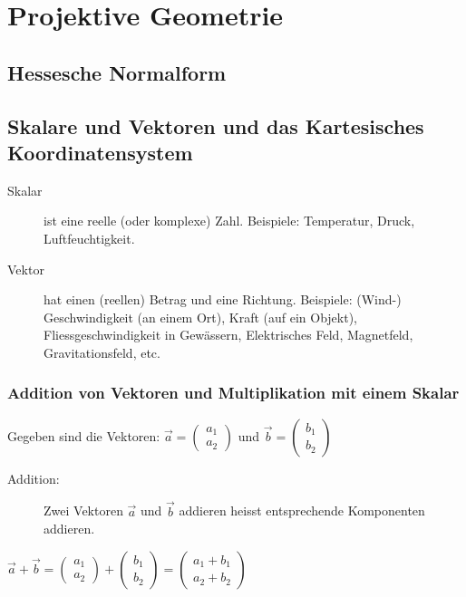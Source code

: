 \chapter{Projektive Geometrie}
\section{Hessesche Normalform}

\section{Skalare und Vektoren und das Kartesisches Koordinatensystem}

\begin{description}
	\item[Skalar]
	ist eine reelle (oder komplexe) Zahl. Beispiele: Temperatur,
	Druck, Luftfeuchtigkeit.
	\item[Vektor]
	hat einen (reellen) Betrag und eine Richtung. Beispiele:
	(Wind-) Geschwindigkeit (an einem Ort), Kraft (auf ein
	Objekt), Fliessgeschwindigkeit in Gewässern, Elektrisches
	Feld, Magnetfeld, Gravitationsfeld, etc.
\end{description}

\subsection{Addition von Vektoren und Multiplikation mit einem Skalar}

Gegeben sind die Vektoren:
\begin{math}
	\vec{a} = 
	\begin{pmatrix} a_{1} \\ a_{2} \end{pmatrix}
\end{math}
und
\begin{math}
	\vec{b} = 
	\begin{pmatrix} b_{1} \\ b_{2} \end{pmatrix}
\end{math}

\begin{description}
	\item[Addition:]
	Zwei Vektoren $\vec{a}$ und $\vec{b}$ addieren heisst entsprechende Komponenten addieren. 
\end{description}

\begin{math}
	\vec{a} + \vec{b} = 
	\begin{pmatrix} a_{1} \\ a_{2} \end{pmatrix} +
	\begin{pmatrix} b_{1} \\ b_{2} \end{pmatrix} =
	\begin{pmatrix} a_{1} + b_{1} \\ a_{2} + b_{2} \end{pmatrix}
\end{math}

